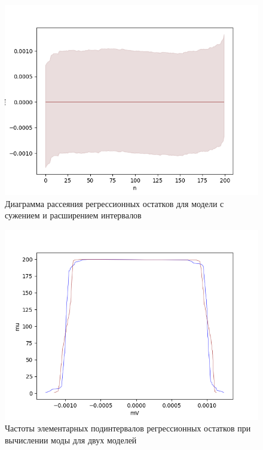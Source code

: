 \begin{figure}[H]
	\begin{center}
		\includegraphics[scale = 0.55]{resources/analysis_of_regression_residuals_0.png}
	\end{center}
	\caption{Диаграмма рассеяния регрессионных остатков для модели с сужением и расширением интервалов} \label{pic:with_reduction}
\end{figure}

\begin{figure}[H]
	\begin{center}
		\includegraphics[scale = 0.55]{resources/mu.png}
	\end{center}
	\caption{Частоты элементарных подинтервалов регрессионных остатков при вычислении моды для двух моделей} \label{pic:freq}
\end{figure} 

